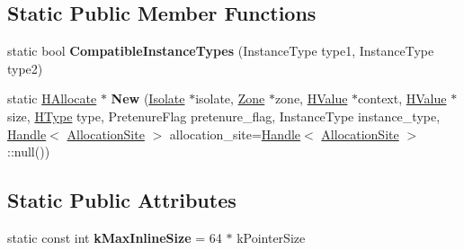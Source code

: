 \subsection*{Static Public Member Functions}
\begin{DoxyCompactItemize}
\item 
static bool {\bfseries Compatible\+Instance\+Types} (Instance\+Type type1, Instance\+Type type2)\hypertarget{classv8_1_1internal_1_1_h_allocate_a28a7f1924ca9e5db08ce62b6e158fe42}{}\label{classv8_1_1internal_1_1_h_allocate_a28a7f1924ca9e5db08ce62b6e158fe42}

\item 
static \hyperlink{classv8_1_1internal_1_1_h_allocate}{H\+Allocate} $\ast$ {\bfseries New} (\hyperlink{classv8_1_1internal_1_1_isolate}{Isolate} $\ast$isolate, \hyperlink{classv8_1_1internal_1_1_zone}{Zone} $\ast$zone, \hyperlink{classv8_1_1internal_1_1_h_value}{H\+Value} $\ast$context, \hyperlink{classv8_1_1internal_1_1_h_value}{H\+Value} $\ast$size, \hyperlink{classv8_1_1internal_1_1_h_type}{H\+Type} type, Pretenure\+Flag pretenure\+\_\+flag, Instance\+Type instance\+\_\+type, \hyperlink{classv8_1_1internal_1_1_handle}{Handle}$<$ \hyperlink{classv8_1_1internal_1_1_allocation_site}{Allocation\+Site} $>$ allocation\+\_\+site=\hyperlink{classv8_1_1internal_1_1_handle}{Handle}$<$ \hyperlink{classv8_1_1internal_1_1_allocation_site}{Allocation\+Site} $>$\+::null())\hypertarget{classv8_1_1internal_1_1_h_allocate_aa5d630532f703f063abe73b2b1e504a4}{}\label{classv8_1_1internal_1_1_h_allocate_aa5d630532f703f063abe73b2b1e504a4}

\end{DoxyCompactItemize}
\subsection*{Static Public Attributes}
\begin{DoxyCompactItemize}
\item 
static const int {\bfseries k\+Max\+Inline\+Size} = 64 $\ast$ k\+Pointer\+Size\hypertarget{classv8_1_1internal_1_1_h_allocate_a5cef31c4358b20ae55ffd690b1c2a75b}{}\label{classv8_1_1internal_1_1_h_allocate_a5cef31c4358b20ae55ffd690b1c2a75b}

\end{DoxyCompactItemize}

